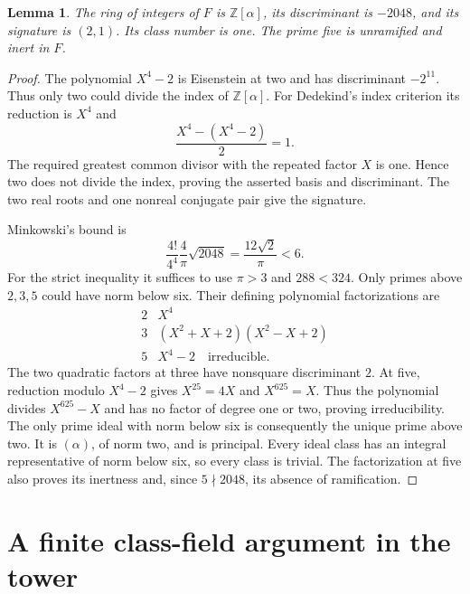 \documentclass[11pt]{article}
\newtheorem{lemma}[theorem]{Lemma}
\newcommand{\Z}{\mathbb Z}
\begin{document}
\begin{lemma}\label{lem:base}
The ring of integers of $F$ is $\Z[\alpha]$, its discriminant is $-2048$,
and its signature is $(2,1)$. Its class number is one. The prime five
is unramified and inert in $F$.
\end{lemma}
\begin{proof}
The polynomial $X^4-2$ is Eisenstein at two and has discriminant
$-2^{11}$. Thus only two could divide the index of $\Z[\alpha]$.
For Dedekind's index criterion its reduction is $X^4$ and
\[
 \frac{X^4-(X^4-2)}2=1.
 \tag{21}\label{eq:index}
\]
The required greatest common divisor with the repeated factor $X$ is
one. Hence two does not divide the index, proving the asserted basis
and discriminant. The two real roots and one nonreal conjugate pair
give the signature.

Minkowski's bound \citep[Theorem~4.3]{Milne2020} is
\[
 \frac{4!}{4^4}\frac4\pi\sqrt{2048}
   =\frac{12\sqrt2}{\pi}<6.
 \tag{22}\label{eq:Minkowski}
\]
For the strict inequality it suffices to use $\pi>3$ and $288<324$.
Only primes above $2,3,5$ could have norm below six. Their defining
polynomial factorizations are
\[
 \begin{array}{c|c}
 2&X^4\\
 3&(X^2+X+2)(X^2-X+2)\\
 5&X^4-2\quad\text{irreducible}.
 \end{array}
 \tag{23}\label{eq:factorizations}
\]
The two quadratic factors at three have nonsquare discriminant $2$.
At five, reduction modulo $X^4-2$ gives $X^{25}=4X$ and $X^{625}=X$.
Thus the polynomial divides $X^{625}-X$ and has no factor of degree
one or two, proving irreducibility. The only prime ideal with norm
below six is consequently the unique prime above two. It is
$(\alpha)$, of norm two, and is principal. Every ideal class has an
integral representative of norm below six, so every class is trivial.
The factorization at five also proves its inertness and, since
$5\nmid2048$, its absence of ramification.
\end{proof}

\section{A finite class-field argument in the tower}
\end{document}
